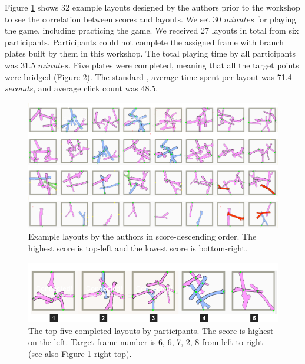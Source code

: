 Figure \ref{fig:testlayouts} shows 32 example layouts designed by the authors prior to the workshop to see the correlation between scores and layouts.
We set 30 $minutes$ for playing the game, including practicing the game.
We received 27 layouts in total from six participants.
Participants could not complete the assigned frame with branch plates built by them in this workshop.
The total playing time by all participants was 31.5 $minutes$.
Five plates were completed, meaning that all the target points were bridged (Figure \ref{fig:layouts}).
The standard , average time spent per layout was 71.4 $seconds$, and average click count was 48.5.

\begin{figure}[ht]
	\begin{center}
		\includegraphics[width = 0.4\paperwidth]{images/fabrication/designs_score2.PNG}
		\caption{Example layouts by the authors in score-descending order. The highest score is top-left and the lowest score is bottom-right.}
		\label{fig:testlayouts}
	\end{center}
\end{figure}

\begin{figure}[ht]
	\begin{center}
		\includegraphics[width = 0.4\paperwidth]{images/fabrication/casestudy.png}
		\caption{The top five completed layouts by participants. The score is highest on the left. Target frame number is 6, 6, 7, 2, 8 from left to right (see also Figure 1 right top).   }
		\label{fig:layouts}
	\end{center}
\end{figure}

